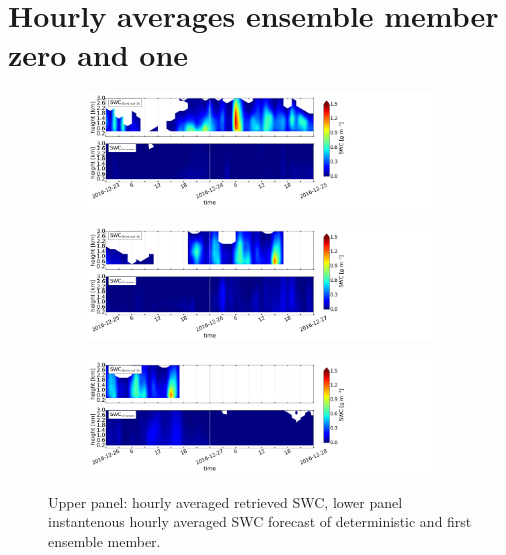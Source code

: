 \section{Hourly averages ensemble member zero and one}%
\label{app:EM1h}

\begin{figure}[h]%
		\centering
		\begin{subfigure}[t]{\textwidth}
    \centering
    	\includegraphics[trim={0.cm 0.8cm 19.cm 0.5cm},clip,width=\textwidth]{./fig_vert_SWC_1h/20161223}
		\caption{}\label{fig:SWC1h:23}
    \end{subfigure}
\end{figure}
\begin{figure}\ContinuedFloat
		\begin{subfigure}[t]{\textwidth}
    \centering
    	\includegraphics[trim={0.cm 0.8cm 19.cm 0.5cm},clip,width=\textwidth]{./fig_vert_SWC_1h/20161225}
		\caption{}\label{fig:SWC1h:25}
    \end{subfigure}
	\centering
		\begin{subfigure}[t]{\textwidth}
    \centering
    	\includegraphics[trim={0.cm 0.8cm 19.cm 0.5cm},clip,width=\textwidth]{./fig_vert_SWC_1h/20161226}
		\caption{}\label{fig:SWC1h:26}
    \end{subfigure}

    \caption{Upper panel: hourly averaged retrieved SWC, lower panel instantenous hourly averaged SWC forecast of deterministic and first ensemble member.  }\label{fig:SWC_1h}
\end{figure}
